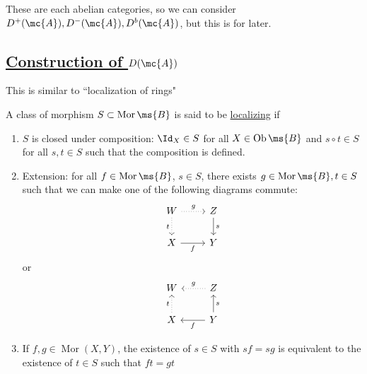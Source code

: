 \documentclass[x11names,reqno,14pt]{extarticle}
\DeclareMathOperator{\Ob}{Ob}
\DeclareMathOperator{\Mor}{Mor}
\begin{document}
These are each abelian categories, so we can consider $D^+(\mc{A}), D^-(\mc{A}), D^b(\mc{A})$, but this is for later. 

\subsection*{\underline{Construction of $D(\mc{A})$}}

This is similar to ``localization of rings"


A class of morphism $S \subset \Mor \ms{B}$ is said to be \underline{localizing} if
\begin{enumerate}[label=(\alph*)]

\item $S$ is closed under composition: $\Id_X\in S$ for all $X \in \Ob\ms{B}$ and $s \circ t \in S$ for all $s, t \in S$ such that the composition is defined. 

\item Extension: for all $f \in \Mor \ms{B}$, $s \in S$, there exists $g \in \Mor \ms{B}, t \in S$ such that we can make one of the following diagrams commute:
\[
\begin{tikzcd}
W \ar[r, dotted, "g"] \ar[d, dotted, "t"'] & Z \ar[d, "s"] \\
X \ar[r, "f"'] & Y
\end{tikzcd}
\]
or
\[
\begin{tikzcd}
W & \ar[l, dotted, "g"'] Z \\
X \ar[u, dotted, "t"]  & \ar[l, "f"] \ar[u, "s"'] Y
\end{tikzcd}
\]

\item If $f, g \in \Mor(X, Y)$, the existence of $s \in S$ with $sf = sg$ is equivalent to the existence of $t \in S$ such that $ft = gt$

\end{enumerate}

\end{document}

